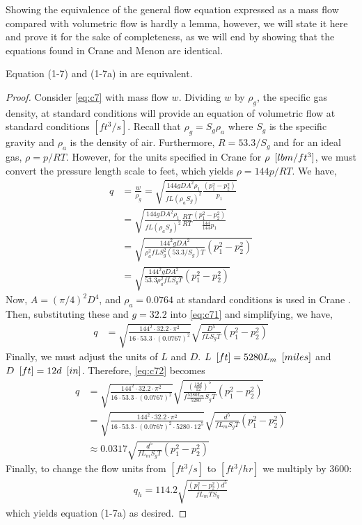 \documentclass{psig_required_latex_files/psig}
\begin{document}
Showing the equivalence of the general flow equation expressed as a mass flow compared with volumetric flow is hardly a lemma, however, we will state it here and prove it for the sake of completeness, as we will end by showing that the equations found in Crane and Menon are identical.
\begin{lemma}
Equation (1-7) and (1-7a) in \cite[Chapter 1]{crane1980flow} are equivalent.
\end{lemma}
\begin{proof}
Consider \eqref{eq:c7} with mass flow $w$.  Dividing $w$ by $\rho_g$, the specific gas density, at standard conditions will provide an equation of volumetric flow at standard conditions $[ft^3/s]$.  Recall that $\rho_g = S_g \rho_a$ where $S_g$ is the specific gravity and $\rho_a$ is the density of air.  Furthermore, $R=53.3/S_g$ and for an ideal gas, $\rho = p/RT$. However, for the units specified in Crane for $\rho \enskip [lbm/ft^3]$, we must convert the pressure length scale to feet, which yields $\rho = 144p/RT$. We have, 
\begin{align}
q &= \frac{w}{\rho_g} = \sqrt{\frac{144 g D A^2 \rho_1}{f L (\rho_a S_g)^2} \frac{(p_1^2 - p_2^2)}{p_1}} \nonumber \\
&= \sqrt{\frac{144 g D A^2 \rho_1}{f L (\rho_a S_g)^2 } \frac{RT}{RT}\frac{(p_1^2 - p_2^2)}{\frac{144}{144}p_1}} \nonumber\\
&= \sqrt{\frac{144^2 g D A^2 }{\rho_a^2 f L S_g^2 (53.3/S_g)T} (p_1^2 - p_2^2)} \nonumber \\
&= \sqrt{\frac{144^2 g D A^2 }{53.3 \rho_a^2 f L S_g T} (p_1^2 - p_2^2)} \label{eq:c71}
\end{align}
Now, $A = (\pi/4)^2 D^4$, and $\rho_a = 0.0764$ at standard conditions is used in Crane \cite[Appendix B]{crane1980flow}.  Then, substituting these and $g = 32.2$ into \eqref{eq:c71} and simplifying, we have,
\begin{align}\label{eq:c72}
q &=  \sqrt{\frac{144^2 \cdot 32.2 \cdot \pi^2}{16 \cdot 53.3 \cdot (0.0767)^2}} \sqrt{\frac{D^5 }{f L S_g T} (p_1^2 - p_2^2)}
\end{align}
Finally, we must adjust the units of $L$ and $D$.  $L \enskip [ft] = 5280 L_m \enskip [miles]$ and $D \enskip [ft] = 12 d \enskip [in]$.  Therefore, \eqref{eq:c72} becomes
\begin{align}
q &=  \sqrt{\frac{144^2 \cdot 32.2 \cdot \pi^2}{16 \cdot 53.3 \cdot (0.0767)^2}} \sqrt{\frac{(\frac{12d}{12})^5 }{f \frac{5280 L_m}{5280} S_g T} (p_1^2 - p_2^2)} \nonumber \\
&=  \sqrt{\frac{144^2 \cdot 32.2 \cdot \pi^2}{16 \cdot 53.3 \cdot (0.0767)^2 \cdot 5280 \cdot 12^5 }} \sqrt{\frac{d^5 }{f L_m S_g T} (p_1^2 - p_2^2)} \label{eq:c73}\\
&\approx 0.0317 \sqrt{\frac{d^5 }{f L_m S_g T} (p_1^2 - p_2^2)}
\end{align}
Finally, to change the flow units from $[ft^3/s]$ to $[ft^3/hr]$ we multiply by 3600:
\begin{align}\label{eq:c74}
q_h = 114.2 \sqrt{\frac{(p_1^2 - p_2^2) d^5 }{f L_m T S_g } }
\end{align}
which yields equation (1-7a) as desired.
\end{proof}
\end{document}
